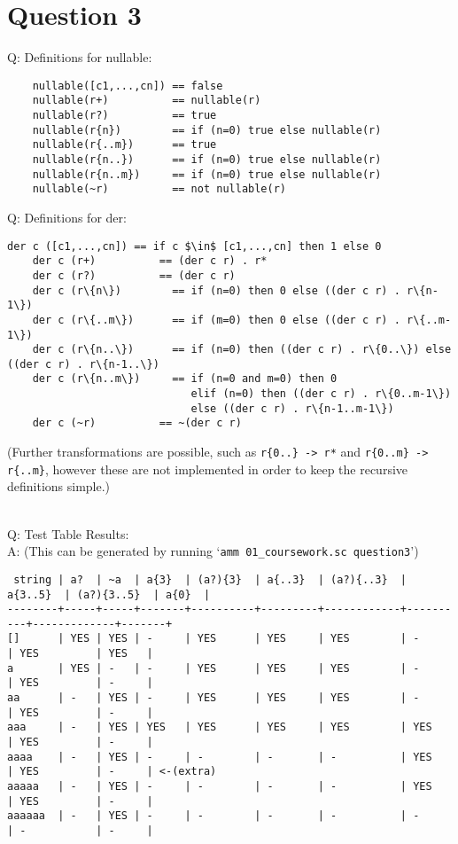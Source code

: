 \documentclass[english]{scrartcl}
\begin{document}
\section*{Question 3}
Q: Definitions for nullable:
\\
\begin{verbatim}
    nullable([c1,...,cn]) == false
    nullable(r+)          == nullable(r)
    nullable(r?)          == true
    nullable(r{n})        == if (n=0) true else nullable(r)
    nullable(r{..m})      == true
    nullable(r{n..})      == if (n=0) true else nullable(r)
    nullable(r{n..m})     == if (n=0) true else nullable(r)
    nullable(~r)          == not nullable(r)
\end{verbatim}


Q: Definitions for der:
\\
\begin{Verbatim}[mathescape,commandchars=\\\{\}]
    der c ([c1,...,cn]) == if c $\in$ [c1,...,cn] then 1 else 0
    der c (r+)          == (der c r) . r*
    der c (r?)          == (der c r)
    der c (r\{n\})        == if (n=0) then 0 else ((der c r) . r\{n-1\})
    der c (r\{..m\})      == if (m=0) then 0 else ((der c r) . r\{..m-1\})
    der c (r\{n..\})      == if (n=0) then ((der c r) . r\{0..\}) else ((der c r) . r\{n-1..\})
    der c (r\{n..m\})     == if (n=0 and m=0) then 0
                             elif (n=0) then ((der c r) . r\{0..m-1\})
                             else ((der c r) . r\{n-1..m-1\})
    der c (~r)          == ~(der c r)
\end{Verbatim}

(Further transformations are possible, such as \verb~r{0..} -> r*~ and \verb~r{0..m} -> r{..m}~, however these are not implemented in order to keep the recursive definitions simple.)

\mbox{}\\

Q: Test Table Results: \\
A: (This can be generated by running `\verb|amm 01_coursework.sc question3|')
\footnotesize\begin{verbatim}
 string | a?  | ~a  | a{3}  | (a?){3}  | a{..3}  | (a?){..3}  | a{3..5}  | (a?){3..5}  | a{0}  |
--------+-----+-----+-------+----------+---------+------------+----------+-------------+-------+
[]      | YES | YES | -     | YES      | YES     | YES        | -        | YES         | YES   |
a       | YES | -   | -     | YES      | YES     | YES        | -        | YES         | -     |
aa      | -   | YES | -     | YES      | YES     | YES        | -        | YES         | -     |
aaa     | -   | YES | YES   | YES      | YES     | YES        | YES      | YES         | -     |
aaaa    | -   | YES | -     | -        | -       | -          | YES      | YES         | -     | <-(extra)
aaaaa   | -   | YES | -     | -        | -       | -          | YES      | YES         | -     |
aaaaaa  | -   | YES | -     | -        | -       | -          | -        | -           | -     |
\end{verbatim}
\normalsize
\end{document}
